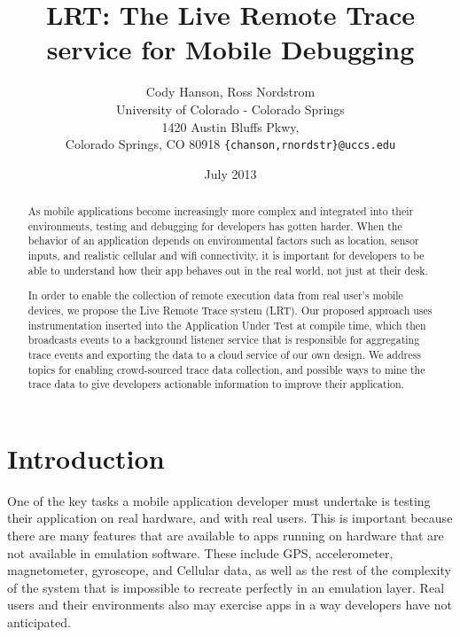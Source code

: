 \documentclass{acm_proc_article-sp}
\begin{document}
\title{LRT: The Live Remote Trace service for Mobile Debugging}
\author{Cody Hanson, Ross Nordstrom\\
        University of Colorado - Colorado Springs\\
        1420 Austin Bluffs Pkwy,\\
        Colorado Springs, CO 80918
        \texttt{\{chanson,rnordstr\}@uccs.edu}
       }
\date{July 2013}

\maketitle

\begin{abstract}
    As mobile applications become increasingly  more complex and integrated into their
    environments, testing and debugging for developers has gotten harder.
    When the behavior of an application depends on environmental factors 
    such as location, sensor inputs, and realistic cellular and wifi connectivity,
    it is important for developers to be able to understand how their app
    behaves out in the real world, not just at their desk.

    In order to enable the collection of remote execution data from real user's
    mobile devices, we propose the Live Remote Trace system (LRT). Our proposed
    approach uses instrumentation inserted into the Application Under Test at compile time,
    which then broadcasts events to a background listener service that is responsible for
    aggregating trace events and exporting the data to a cloud service of our
    own design. We address topics for enabling crowd-sourced trace data collection,
    and possible ways to mine the trace data to give developers actionable 
    information to improve their application.
\end{abstract}


\section{Introduction}
One of the key tasks a mobile application developer must undertake is testing 
their application on real hardware, and with real users. This is important 
because there are many features that are available to apps running on hardware 
that are not available in emulation software. These include GPS, accelerometer, 
magnetometer, gyroscope, and Cellular data, as well as the rest of the 
complexity of the system that is impossible to recreate perfectly in an 
emulation layer. Real users and their environments also may exercise apps in
a way developers have not anticipated. 
\end{document}
